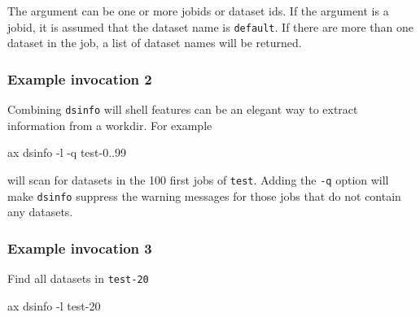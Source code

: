 The argument can be one or more jobids or dataset ids.  If the
argument is a jobid, it is assumed that the dataset name is
\texttt{default}.  If there are more than one dataset in the job, a
list of dataset names will be returned.

\subsubsection*{Example invocation 2}
Combining \texttt{dsinfo} will shell features can be an elegant way to
extract information from a workdir.  For example
\begin{shell}
ax dsinfo -l -q test-{0..99}
\end{shell}
will scan for datasets in the 100 first jobs of \texttt{test}.
Adding the \texttt{-q} option will make \texttt{dsinfo} suppress the
warning messages for those jobs that do not contain any datasets.

\subsubsection*{Example invocation 3}
Find all datasets in \texttt{test-20}
\begin{shell}
ax dsinfo -l test-20
\end{shell}



